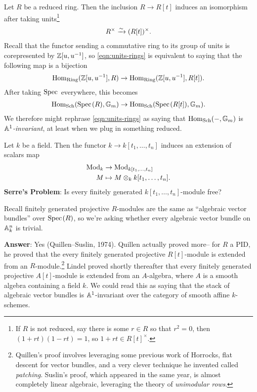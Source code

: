 \documentclass[11pt,openany]{book}
\begin{document}
\begin{example} Let $R$ be a reduced ring. Then the inclusion $R \to R[t]$ induces an isomorphism after taking units\footnote{If $R$ is not reduced, say there is some $r\in R$ so that $r^2 = 0$, then $(1+rt)(1-rt) = 1$, so $1+rt\in R[t]^\times$.}
\begin{equation}\label{eqn:units-rings}
\begin{aligned}
    R^\times \xrightarrow{\sim} (R[t])^\times.
\end{aligned}
\end{equation}
Recall that the functor sending a commutative ring to its group of units is corepresented by $\mathbb{Z}[u,u^{-1}]$, so \autoref{eqn:units-rings} is equivalent to saying that the following map is a bijection
\begin{align*}
    \mathrm{Hom}_{\mathrm{Ring}}(\mathbb{Z}[u,u^{-1}],R) \to \mathrm{Hom}_{\mathrm{Ring}}(\mathbb{Z}[u,u^{-1}],R[t]).
\end{align*}
After taking $\text{Spec}\hspace{0.1em}$ everywhere, this becomes
\begin{align*}
    \mathrm{Hom}_{\mathrm{Sch}}(\text{Spec}\hspace{0.1em}(R),\mathbb{G}_m) \to \mathrm{Hom}_{\mathrm{Sch}}(\text{Spec}\hspace{0.1em}(R[t]),\mathbb{G}_m).
\end{align*}
We therefore might rephrase \autoref{eqn:units-rings} as saying that $\mathrm{Hom}_{\mathrm{Sch}}(-,\mathbb{G}_m)$ is \textit{$\mathbb{A}^1$-invariant}, at least when we plug in something reduced.
\end{example}

\begin{example} Let $k$ be a field. Then the functor $k \to k[t_1, \ldots, t_n]$ induces an extension of scalars map
\begin{align*}
    \mathrm{Mod}_k &\to \mathrm{Mod}_{k[t_1, \ldots, t_n]} \\
    M &\mapsto M \otimes_k k[t_1, \ldots, t_n].
\end{align*}
\textbf{Serre's Problem}: Is every finitely generated $k[t_1, \ldots, t_n]$-module free?

Recall finitely generated projective $R$-modules are the same as ``algebraic vector bundles'' over $\text{Spec}\hspace{0.1em}(R)$, so we're asking whether every algebraic vector bundle on $\mathbb{A}^n_k$ is trivial.

\textbf{Answer}: Yes (Quillen--Suslin, 1974). Quillen actually proved more-- for $R$ a PID, he proved that the every finitely generated projective $R[t]$-module is extended from an $R$-module.\footnote{%
Quillen's proof involves leveraging some previous work of Horrocks, flat descent for vector bundles, and a very clever technique he invented called \textit{patching}. Suslin's proof, which appeared in the same year, is almost completely linear algebraic, leveraging the theory of \textit{unimodular rows}.} Lindel proved shortly thereafter that every finitely generated projective $A[t]$-module is extended from an $A$-algebra, where $A$ is a smooth algebra containing a field $k$. We could read this as saying that the stack of algebraic vector bundles is $\mathbb{A}^1$-invariant over the category of smooth affine $k$-schemes.
\end{example}
\end{document}
